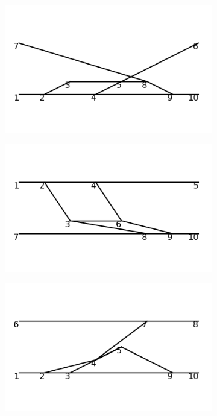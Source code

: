 \documentclass[11pt,a4paper,twoside,pdf]{article}
\numberwithin{equation}{section}
\begin{document}
\begin{figure}[h!]
\begin{subfigure}[t]{0.16\textwidth}
    \end{subfigure}
    \hfill
    \begin{subfigure}[t]{0.16\textwidth}
        \centering
        \includegraphics[width=\textwidth]{plots/order6_2to2/33.png}
    \end{subfigure}
    \hfill
    \begin{subfigure}[t]{0.16\textwidth}
        \centering
        \includegraphics[width=\textwidth]{plots/order6_2to2/34.png}
    \end{subfigure}
    \hfill
    \begin{subfigure}[t]{0.16\textwidth}
        \centering
        \includegraphics[width=\textwidth]{plots/order6_2to2/35.png}

\end{subfigure}
\end{figure}
\end{document}
